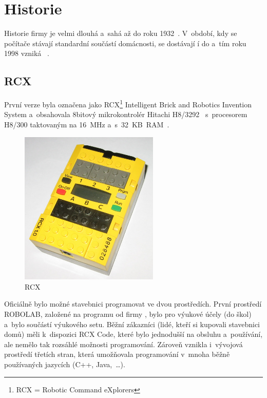 \chapter{Historie \legoM}

Historie firmy \lego{ }je velmi dlouhá a~sahá až do roku 1932~\cite{lego_GroupHistory1930s}. 
V~období, kdy se počítače stávají standardní součástí domácnosti, se dostávají í do \lego{} a~tím roku 1998 vzniká  \legoM{}~\cite{lego_mindstormsHistory}.


\section{\legoM{ }RCX}

První verze byla označena jako \legoM{ }RCX\footnote{RCX = Robotic Command eXplorers} Intelligent Brick and Robotics Invention System a~obsahovala 8bitový mikrokontrolér Hitachi H8/3292~\cite{hitachi_microcontrolerH8series} s~procesorem H8/300 taktovaným na 16~MHz a~s~32~KB~RAM~\cite{legoMindstormsRCX_Manual}.

\begin{figure}[h]
	\centering
	\includegraphics[width=250px]{images/lego-mindstorms-rcx_wikipedia.jpg}
	\caption[\legoM{ }RCX]{\legoM{ }RCX\protect\footnotemark}
	\label{fig:lego-mindstorms-rcx-wikipedia}
\end{figure}


Oficiálně bylo možné stavebnici programovat ve dvou prostředích. První prostředí ROBOLAB, založené na programu \labview{ }od firmy \NI, bylo pro výukové účely (do škol) a~bylo součástí výukového setu. 
Běžní zákazníci (lidé, kteří si kupovali stavebnici domů) měli k~dispozici RCX Code, které bylo jednodušší na obsluhu a~používání, ale nemělo tak rozsáhlé možnosti programování. 
Zároveň vznikla i~vývojová prostředí třetích stran, která umožňovala programování v~mnoha běžně používaných jazycích (C++, Java,~\dots).


